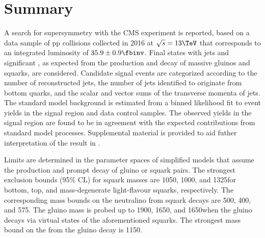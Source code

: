 
\section{Summary}
\label{sec:summary}

A search for supersymmetry with the CMS experiment is reported, based
on a data sample of pp collisions collected in 2016 at $\sqrt{s} =
13\TeV$ that corresponds to an integrated luminosity of $35.9 \pm 0.9
\fbinv$. Final states with jets and significant \ptvecmiss, as
expected from the production and decay of massive gluinos and squarks,
are considered. 
Candidate signal events are categorized according to the number of
reconstructed jets, the number of jets identified to originate from
bottom quarks, and the scalar and vector sums of the transverse
momenta of jets. %
The standard model background is estimated from a binned
likelihood fit to event yields in the signal region and data control
samples. The observed yields in the signal region are found to be in
agreement with the expected contributions from standard model
processes. Supplemental material is provided to aid futher
interpretation of the result in \suppMaterial.

Limits are determined in the parameter spaces of simplified models
that assume the production and prompt decay of gluino or squark
pairs. The strongest exclusion bounds (95\% CL) for squark masses are
1050, 1000, and 1325\GeV for bottom, top, and mass-degenerate
light-flavour squarks, respectively. The corresponding mass bounds on
the neutralino \PSGczDo from squark decays are 500, 400, and
575\GeV. The gluino mass is probed up to 1900, 1650, and 1650\GeV when
the gluino decays via virtual states of the aforementioned
squarks. The strongest mass bound on the \PSGczDo from the gluino
decay is 1150\GeV.

